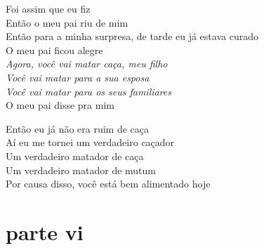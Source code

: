 \noindent   Foi assim que eu fiz\\
  Então o meu pai riu de mim\\
  Então para a minha surpresa, de tarde eu já estava curado\\
  O meu pai ficou alegre\\
  \textit{Agora, você vai matar caça, meu filho}\\
  \textit{Você vai matar para a sua esposa}\\
  \textit{Você vai matar para os seus familiares}\\
  O meu pai disse pra mim
 
 \smallskip
 \begin{center}\end{center}
 \smallskip
 
\noindent   Então eu já não era ruim de caça\\
  Aí eu me tornei um verdadeiro caçador\\
  Um verdadeiro matador de caça\\
  Um verdadeiro matador de mutum\\
  Por causa disso, você está bem alimentado hoje
 
 
\medskip
\section{parte vi}

